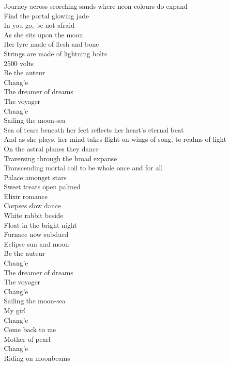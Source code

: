 Journey across scorching sands where neon colours do expand\\
Find the portal glowing jade\\
In you go, be not afraid\\
As she sits upon the moon\\
Her lyre made of flesh and bone\\
Strings are made of lightning bolts\\
2500 volts\\

Be the auteur\\
Chang'e\\
The dreamer of dreams\\
The voyager\\
Chang'e\\
Sailing the moon-sea\\

Sea of tears beneath her feet reflects her heart's eternal beat\\
And as she plays, her mind takes flight on wings of song, to realms of light\\
On the astral planes they dance\\
Traversing through the broad expanse\\
Transcending mortal coil to be whole once and for all\\

Palace amongst stars\\
Sweet treats open palmed\\
Elixir romance\\
Corpses slow dance\\
White rabbit beside\\
Float in the bright night\\
Furnace now subdued\\
Eclipse sun and moon\\

Be the auteur\\
Chang'e\\
The dreamer of dreams\\
The voyager\\
Chang'e\\
Sailing the moon-sea\\
My girl\\
Chang'e\\
Come back to me\\
Mother of pearl\\
Chang'e\\
Riding on moonbeams\\

